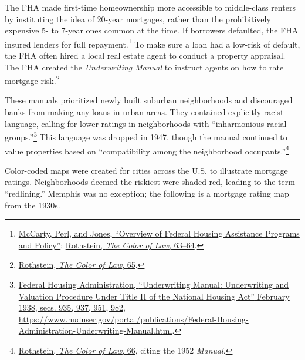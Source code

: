 \documentclass[
  openany]{book}
\begin{document}
The FHA made first-time homeownership more accessible to middle-class renters by instituting the idea of 20-year mortgages, rather than the prohibitively expensive 5- to 7-year ones common at the time. If borrowers defaulted, the FHA insured lenders for full repayment.\footnote{\protect\hyperlink{ref-mccarty2019}{McCarty, Perl, and Jones, {``Overview of Federal Housing Assistance Programs and Policy''}}; \protect\hyperlink{ref-rothstein2017}{Rothstein, \emph{The Color of Law}, 63--64}.} To make sure a loan had a low-risk of default, the FHA often hired a local real estate agent to conduct a property appraisal. The FHA created the \emph{Underwriting Manual} to instruct agents on how to rate mortgage risk.\footnote{\protect\hyperlink{ref-rothstein2017}{Rothstein, \emph{The Color of Law}, 65}.}

These manuals prioritized newly built suburban neighborhoods and discouraged banks from making any loans in urban areas. They contained explicitly racist language, calling for lower ratings in neighborhoods with ``inharmonious racial groups.''\footnote{\protect\hyperlink{ref-federalhousingadministration1938}{Federal Housing Administration, {``Underwriting Manual: Underwriting and Valuation Procedure Under Title II of the National Housing Act''} February 1938, secs. 935, 937, 951, 982, \url{https://www.huduser.gov/portal/publications/Federal-Housing-Administration-Underwriting-Manual.html}}.} This language was dropped in 1947, though the manual continued to value properties based on ``compatibility among the neighborhood occupants.''\footnote{\protect\hyperlink{ref-rothstein2017}{Rothstein, \emph{The Color of Law}, 66}, citing the 1952 \emph{Manual}.}

Color-coded maps were created for cities across the U.S. to illustrate mortgage ratings. Neighborhoods deemed the riskiest were shaded red, leading to the term ``redlining.'' Memphis was no exception; the following is a mortgage rating map from the 1930s.
\end{document}
